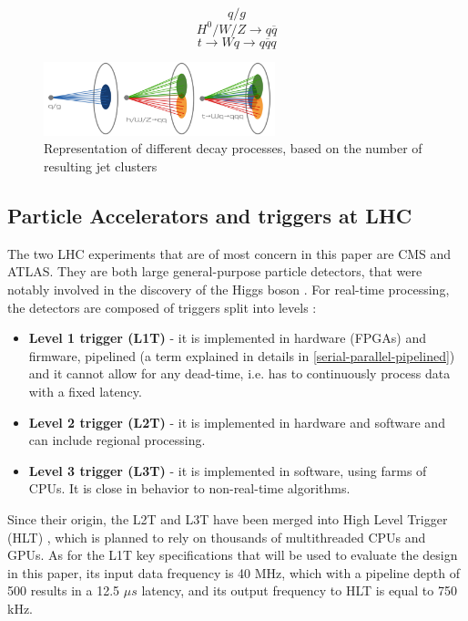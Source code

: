\[ q / g \]
\[ H^0 / W / Z \rightarrow q\overline{q} \]
\[ t \rightarrow Wq \rightarrow q\overline{q}q \]

\begin{figure}[hpt!]
  \centering
  \includegraphics[trim={0cm 0cm 0cm 0cm}, width=0.6\textwidth, center]{background/jedi_jets.png}
  \caption{Representation of different decay processes, based on the number of resulting jet clusters}
  \label{fig:jedi-jets}
\end{figure}

\subsection{Particle Accelerators and triggers at LHC}
The two LHC experiments that are of most concern in this paper are CMS and ATLAS. They are both large general-purpose particle detectors, that were notably involved in the discovery of the Higgs boson \cite{47-greeene2013higgs}. For real-time processing, the detectors are composed of triggers split into levels \citep[p.16]{48-trigger}:

\begin{itemize}
  \item \textbf{Level 1 trigger (L1T)} - it is implemented in hardware (FPGAs) and firmware, pipelined (a term explained in details in \autoref{serial-parallel-pipelined}) and it cannot allow for any dead-time, i.e. has to continuously process data with a fixed latency.
  \item \textbf{Level 2 trigger (L2T)} - it is implemented in hardware and software and can include regional processing.
  \item \textbf{Level 3 trigger (L3T)} - it is implemented in software, using farms of CPUs. It is close in behavior to non-real-time algorithms.
\end{itemize}

Since their origin, the L2T and L3T have been merged into High Level Trigger (HLT) \citep[p.47]{49-tappertriggering}, which is planned to rely on thousands of multithreaded CPUs and GPUs. As for the L1T key specifications that will be used to evaluate the design in this paper, its input data frequency is 40 MHz, which with a pipeline depth of 500 results in a 12.5 \(\mu s\) latency, and its output frequency to HLT is equal to 750 kHz.